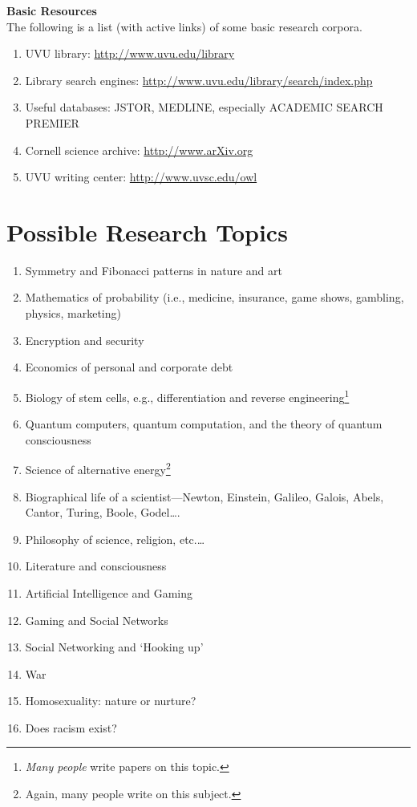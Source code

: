 \documentclass [11pt]{article}
\begin{document}
  
  {\bf Basic Resources}\\
  The following is a list (with active links) of some basic research corpora.
  \begin{enumerate}
\item UVU library: \href{http://www.uvu.edu/library}{http://www.uvu.edu/library}
\item Library search engines: \href{http://www.uvu.edu/library/search/index.php}{http://www.uvu.edu/library/search/index.php}
\item Useful databases: JSTOR, MEDLINE, especially ACADEMIC SEARCH PREMIER
\item Cornell science archive: \href{http://www.arXiv.org}{http://www.arXiv.org}
\item UVU writing center: \href{http://www.uvsc.edu/owl}{http://www.uvsc.edu/owl}
\end{enumerate}
   \vfill\eject

    

\section{Possible Research Topics}
\begin{enumerate}
\item Symmetry and Fibonacci patterns in nature and art
\item Mathematics of probability (i.e., medicine, insurance, game shows, gambling, physics, marketing)
\item Encryption and security
\item Economics of personal and corporate debt
\item Biology of stem cells, e.g., differentiation and reverse engineering\footnote{\emph{Many people} write papers on this topic.}
\item Quantum computers, quantum computation, and the theory of quantum consciousness
\item Science of alternative energy\footnote{Again, many people write on this subject.}
\item Biographical life of a scientist---Newton, Einstein, Galileo, Galois, Abels, Cantor, Turing, Boole, Godel\ldots{}.
\item Philosophy of science, religion, etc.\ldots
\item Literature and consciousness
\item Artificial Intelligence and Gaming
\item Gaming and Social Networks
\item Social Networking and `Hooking up'
\item War
\item Homosexuality: nature or nurture?
\item Does racism exist?\end{enumerate}
\end{document}
